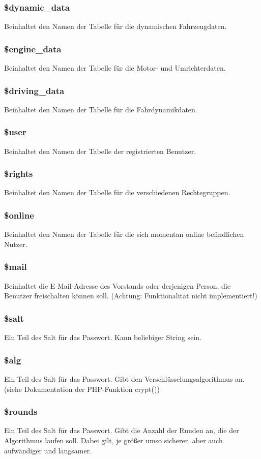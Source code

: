 \documentclass[fontsize = 12pt, paper = a4]{scrreprt}
\begin{document}
\subsubsection*{\$dynamic\_data}
Beinhaltet den Namen der Tabelle für die dynamischen Fahrzeugdaten.
\subsubsection*{\$engine\_data}
Beinhaltet den Namen der Tabelle für die Motor- und Umrichterdaten.
\subsubsection*{\$driving\_data}
Beinhaltet den Namen der Tabelle für die Fahrdynamikdaten.
\subsubsection*{\$user}
Beinhaltet den Namen der Tabelle der registrierten Benutzer.
\subsubsection*{\$rights}
Beinhaltet den Namen der Tabelle für die verschiedenen Rechtegruppen.
\subsubsection*{\$online}
Beinhaltet den Namen der Tabelle für die sich momentan online befindlichen Nutzer.
\subsubsection*{\$mail}
Beinhaltet die E-Mail-Adresse des Vorstands oder derjenigen Person, die Benutzer freischalten können soll. (Achtung: Funktionalität nicht implementiert!)
\subsubsection*{\$salt}
Ein Teil des Salt für das Passwort. Kann beliebiger String sein.
\subsubsection*{\$alg}
Ein Teil des Salt für das Passwort. Gibt den Verschlüsselungsalgorithmus an. (siehe Dokumentation der PHP-Funktion crypt())
\subsubsection*{\$rounds}
Ein Teil des Salt für das Passwort. Gibt die Anzahl der Runden an, die der Algorithmus laufen soll. Dabei gilt, je größer umso sicherer, aber auch aufwändiger und langsamer.
\end{document}
